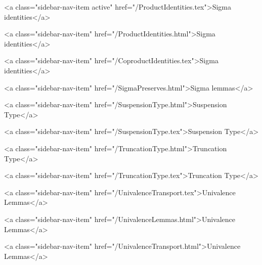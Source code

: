       
    
      
        
          <a class="sidebar-nav-item active" href="/ProductIdentities.tex">Sigma identities</a>
        
      
    
      
        
          <a class="sidebar-nav-item" href="/ProductIdentities.html">Sigma identities</a>
        
      
    
      
        
          <a class="sidebar-nav-item" href="/CoproductIdentities.tex">Sigma identities</a>
        
      
    
      
        
          <a class="sidebar-nav-item" href="/SigmaPreserves.html">Sigma lemmas</a>
        
      
    
      
        
          <a class="sidebar-nav-item" href="/SuspensionType.html">Suspension Type</a>
        
      
    
      
        
          <a class="sidebar-nav-item" href="/SuspensionType.tex">Suspension Type</a>
        
      
    
      
        
          <a class="sidebar-nav-item" href="/TruncationType.html">Truncation Type</a>
        
      
    
      
        
          <a class="sidebar-nav-item" href="/TruncationType.tex">Truncation Type</a>
        
      
    
      
        
          <a class="sidebar-nav-item" href="/UnivalenceTransport.tex">Univalence Lemmas</a>
        
      
    
      
        
          <a class="sidebar-nav-item" href="/UnivalenceLemmas.html">Univalence Lemmas</a>
        
      
    
      
        
          <a class="sidebar-nav-item" href="/UnivalenceTransport.html">Univalence Lemmas</a>
        
